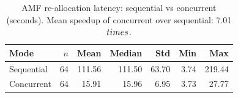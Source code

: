 \begin{table}[htbp]
\centering
\caption{AMF re-allocation latency: sequential vs concurrent (seconds). Mean speedup of concurrent over sequential: 7.01$\\times$.}
\label{tab:comparison}
\begin{tabular}{lrrrrrr}
\hline
Mode & $n$ & Mean & Median & Std & Min & Max \\
\hline
Sequential & 64 & 111.56 & 111.50 & 63.70 & 3.74 & 219.44 \\
Concurrent & 64 & 15.91 & 15.96 & 6.95 & 3.73 & 27.77 \\
\hline
\end{tabular}
\end{table}
